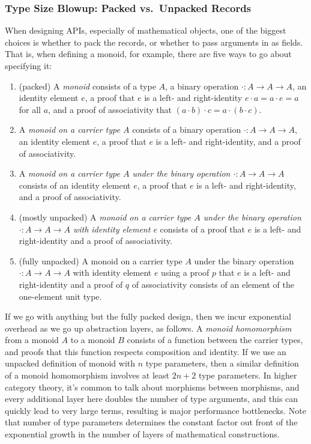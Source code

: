 \subsubsection{Type Size Blowup: Packed vs.~Unpacked Records}
When designing APIs, especially of mathematical objects, one of the biggest choices is whether to pack the records, or whether to pass arguments in as fields.
That is, when defining a monoid, for example, there are five ways to go about specifying it:
\begin{enumerate}
    \item
    (packed)
    A \emph{monoid} consists of a type $A$, a binary operation $\cdot : A \to A \to A$, an identity element $e$, a proof that $e$ is a left- and right-identity $e \cdot a = a \cdot e = a$ for all $a$, and a proof of associativity that $(a \cdot b) \cdot c = a \cdot (b \cdot c)$.
    \item
    A \emph{monoid on a carrier type $A$} consists of a binary operation $\cdot : A \to A \to A$, an identity element $e$, a proof that $e$ is a left- and right-identity, and a proof of associativity.
    \item
    A \emph{monoid on a carrier type $A$ under the binary operation $\cdot : A \to A \to A$} consists of an identity element $e$, a proof that $e$ is a left- and right-identity, and a proof of associativity.
    \item
    (mostly unpacked)
    A \emph{monoid on a carrier type $A$ under the binary operation $\cdot : A \to A \to A$ with identity element $e$} consists of a proof that $e$ is a left- and right-identity and a proof of associativity.
    \item
    (fully unpacked) A monoid on a carrier type $A$ under the binary operation $\cdot : A \to A \to A$ with identity element $e$ using a proof $p$ that $e$ is a left- and right-identity and a proof of $q$ of associativity consists of an element of the one-element unit type.
\end{enumerate}

If we go with anything but the fully packed design, then we incur exponential overhead as we go up abstraction layers, as follows.
A \emph{monoid homomorphism} from a monoid $A$ to a monoid $B$ consists of a function between the carrier types, and proofs that this function respects composition and identity.
If we use an unpacked definition of monoid with $n$ type parameters, then a similar definition of a monoid homomorphism involves at least $2n+2$ type parameters.
In higher category theory, it's common to talk about morphisms between morphisms, and every additional layer here doubles the number of type arguments, and this can quickly lead to very large terms, resulting is major performance bottlenecks.
Note that number of type parameters determines the constant factor out front of the exponential growth in the number of layers of mathematical constructions.


